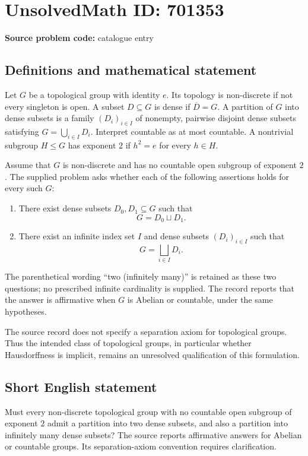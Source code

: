 \documentclass[11pt]{article}
\begin{document}
\section*{UnsolvedMath ID: 701353}
\textbf{Source problem code:} catalogue entry
\subsection{Definitions and mathematical statement}
Let \(G\) be a topological group with identity \(e\). Its topology is non-discrete if not every singleton is open. A subset \(D\subseteq G\) is dense if \(\overline{D}=G\). A partition of \(G\) into dense subsets is a family \((D_i)_{i\in I}\) of nonempty, pairwise disjoint dense subsets satisfying \(G=\bigcup_{i\in I}D_i\). Interpret countable as at most countable. A nontrivial subgroup \(H\leq G\) has exponent \(2\) if \(h^2=e\) for every \(h\in H\).

Assume that \(G\) is non-discrete and has no countable open subgroup of exponent \(2\). The supplied problem asks whether each of the following assertions holds for every such \(G\):
\begin{enumerate}
\item There exist dense subsets \(D_0,D_1\subseteq G\) such that
\[
G=D_0\sqcup D_1.
\]
\item There exist an infinite index set \(I\) and dense subsets \((D_i)_{i\in I}\) such that
\[
G=\bigsqcup_{i\in I}D_i.
\]
\end{enumerate}
The parenthetical wording ``two (infinitely many)'' is retained as these two questions; no prescribed infinite cardinality is supplied. The record reports that the answer is affirmative when \(G\) is Abelian or countable, under the same hypotheses.

The source record does not specify a separation axiom for topological groups. Thus the intended class of topological groups, in particular whether Hausdorffness is implicit, remains an unresolved qualification of this formulation.
\subsection{Short English statement}
Must every non-discrete topological group with no countable open subgroup of exponent \(2\) admit a partition into two dense subsets, and also a partition into infinitely many dense subsets? The source reports affirmative answers for Abelian or countable groups. Its separation-axiom convention requires clarification.
\end{document}
